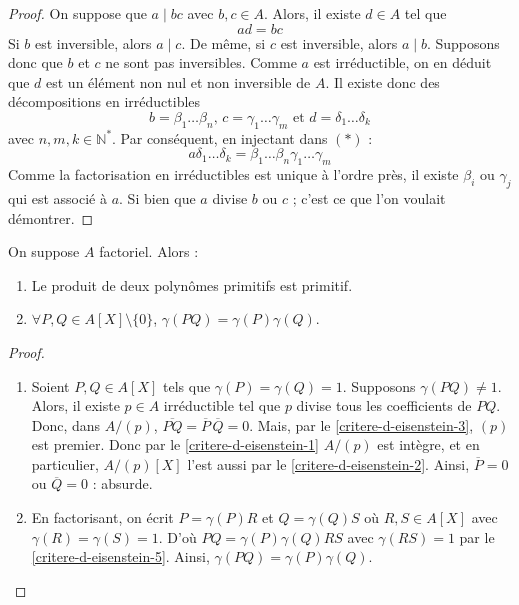   \begin{proof}
    On suppose que $a \mid bc$ avec $b, c \in A$. Alors, il existe $d \in A$ tel que
    \[ ad = bc \tag{$*$} \]
    Si $b$ est inversible, alors $a \mid c$. De même, si $c$ est inversible, alors $a \mid b$. Supposons donc que $b$ et $c$ ne sont pas inversibles. Comme $a$ est irréductible, on en déduit que $d$ est un élément non nul et non inversible de $A$. Il existe donc des décompositions en irréductibles
    \[ b = \beta_1 \dots \beta_n, \, c = \gamma_1 \dots \gamma_m \text{ et } d = \delta_1 \dots \delta_k \]
    avec $n, m, k \in \mathbb{N}^*$. Par conséquent, en injectant dans $(*)$ :
    \[ a \delta_1 \dots \delta_k = \beta_1 \dots \beta_n \gamma_1 \dots \gamma_m \]
    Comme la factorisation en irréductibles est unique à l'ordre près, il existe $\beta_i$ ou $\gamma_j$ qui est associé à $a$. Si bien que $a$ divise $b$ ou $c$ ; c'est ce que l'on voulait démontrer.
  \end{proof}


  \begin{lemma}
    \label{critere-d-eisenstein-4}
    On suppose $A$ factoriel. Alors :
    \begin{enumerate}[label={\bfseries(\roman*)}]
      \item \label{critere-d-eisenstein-5} Le produit de deux polynômes primitifs est primitif.
      \item $\forall P, Q \in A[X] \setminus \{ 0 \}$, $\gamma(PQ) = \gamma(P) \gamma(Q)$.
    \end{enumerate}
  \end{lemma}

  \begin{proof}
    \begin{enumerate}[label={\bfseries(\roman*)}]
      \item Soient $P, Q \in A[X]$ tels que $\gamma(P) = \gamma(Q) = 1$. Supposons $\gamma(PQ) \neq 1$. Alors, il existe $p \in A$ irréductible tel que $p$ divise tous les coefficients de $PQ$. Donc, dans $A/(p)$, $\overline{PQ} = \overline{P} \, \overline{Q} = 0$.
      \newpar
      Mais, par le \cref{critere-d-eisenstein-3}, $(p)$ est premier. Donc par le \cref{critere-d-eisenstein-1} $A/(p)$ est intègre, et en particulier, $A/(p)[X]$ l'est aussi par le \cref{critere-d-eisenstein-2}. Ainsi, $\overline{P} = 0$ ou $\overline{Q} = 0$ : absurde.
      \item En factorisant, on écrit $P = \gamma(P)R$ et $Q = \gamma(Q)S$ où $R, S \in A[X]$ avec $\gamma(R) = \gamma(S) = 1$. D'où $PQ = \gamma(P)\gamma(Q)RS$ avec $\gamma(RS) = 1$ par le \cref{critere-d-eisenstein-5}. Ainsi, $\gamma(PQ) = \gamma(P) \gamma(Q).$
    \end{enumerate}
  \end{proof}

